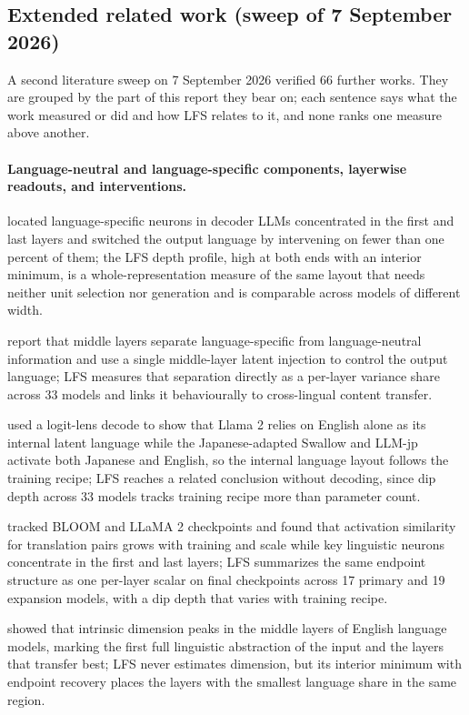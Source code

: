 \documentclass[11pt,a4paper]{article}
\begin{document}
\subsection{Extended related work (sweep of 7 September 2026)}
\label{sec:extrelated}
A second literature sweep on 7 September 2026 verified 66 further works. They are grouped by the part of this report they bear on; each sentence says what the work measured or did and how LFS relates to it, and none ranks one measure above another.

\paragraph{Language-neutral and language-specific components, layerwise readouts, and interventions.}
\citet{kojima2024neurons} located language-specific neurons in decoder LLMs concentrated in the first and last layers and switched the output language by intervening on fewer than one percent of them; the LFS depth profile, high at both ends with an interior minimum, is a whole-representation measure of the same layout that needs neither unit selection nor generation and is comparable across models of different width.

\citet{lopo2025surgery} report that middle layers separate language-specific from language-neutral information and use a single middle-layer latent injection to control the output language; LFS measures that separation directly as a per-layer variance share across 33 models and links it behaviourally to cross-lingual content transfer.

\citet{zhong2025think} used a logit-lens decode to show that Llama 2 relies on English alone as its internal latent language while the Japanese-adapted Swallow and LLM-jp activate both Japanese and English, so the internal language layout follows the training recipe; LFS reaches a related conclusion without decoding, since dip depth across 33 models tracks training recipe more than parameter count.

\citet{zeng2025converging} tracked BLOOM and LLaMA 2 checkpoints and found that activation similarity for translation pairs grows with training and scale while key linguistic neurons concentrate in the first and last layers; LFS summarizes the same endpoint structure as one per-layer scalar on final checkpoints across 17 primary and 19 expansion models, with a dip depth that varies with training recipe.

\citet{cheng2025abstraction} showed that intrinsic dimension peaks in the middle layers of English language models, marking the first full linguistic abstraction of the input and the layers that transfer best; LFS never estimates dimension, but its interior minimum with endpoint recovery places the layers with the smallest language share in the same region.
\end{document}
